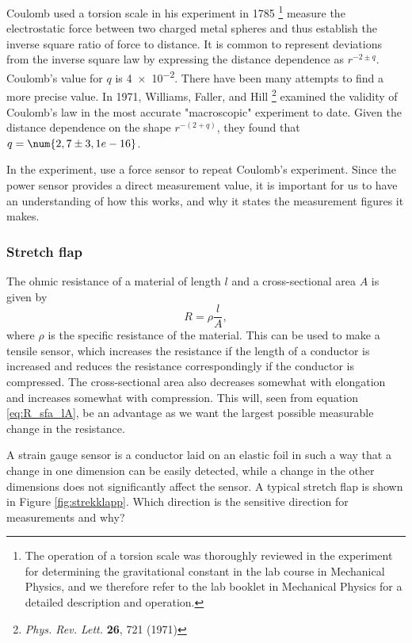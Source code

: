 \documentclass[../Elmag-labhefte-2020.tex]{subfiles}
\begin{document}
Coulomb used a torsion scale in his experiment in 1785 \footnote{The operation of a torsion scale was thoroughly reviewed in the experiment for determining the gravitational constant in the lab course in Mechanical Physics, and we therefore refer to the lab booklet in Mechanical Physics for a detailed description and operation.} measure the electrostatic force between two charged metal spheres and thus establish the inverse square ratio of force to distance. It is common to represent deviations from the inverse square law by expressing the distance dependence as $r^{-2\pm q}$. Coulomb's value for $q$ is \num{4e-2}. There have been many attempts to find a more precise value. In 1971, Williams, Faller, and Hill \footnote{\textit{Phys. Rev. Lett.} \textbf{26}, 721 (1971)} examined the validity of Coulomb's law in the most accurate "macroscopic" experiment to date. Given the distance dependence on the shape $r^{-(2+q)}$, they found that $q = \num{2,7\pm3,1e-16}$.

In the experiment, use a force sensor to repeat Coulomb's experiment. Since the power sensor provides a direct measurement value, it is important for us to have an understanding of how this works, and why it states the measurement figures it makes.


\subsubsection{Stretch flap} \vspace{-5mm}
The ohmic resistance of a material of length $l$ and a cross-sectional area $A$ is given by
\begin{equation}
    R = \rho \frac{l}{A},
    \label{eq:R_sfa_lA}
\end{equation}
where $\rho$ is the specific resistance of the material. This can be used to make a tensile sensor, which increases the resistance if the length of a conductor is increased and reduces the resistance correspondingly if the conductor is compressed. The cross-sectional area also decreases somewhat with elongation and increases somewhat with compression. This will, seen from equation \eqref{eq:R_sfa_lA}, be an advantage as we want the largest possible measurable change in the resistance.

A strain gauge sensor is a conductor laid on an elastic foil in such a way that a change in one dimension can be easily detected, while a change in the other dimensions does not significantly affect the sensor. A typical stretch flap is shown in Figure \ref{fig:strekklapp}. Which direction is the sensitive direction for measurements and why?
\end{document}
